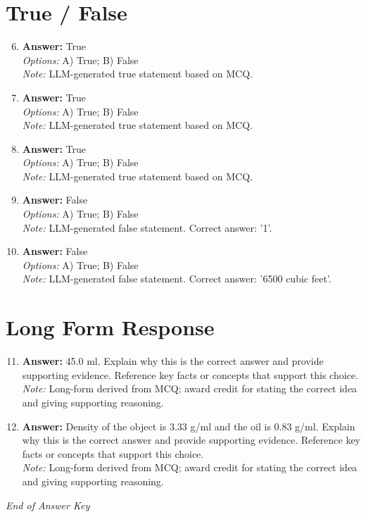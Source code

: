 \documentclass[12pt]{article}
\begin{document}
\section*{True / False}
\begin{enumerate}[label=\arabic*.]
\setcounter{enumi}{5}
\item \textbf{Answer:} True
\\ \textit{Options:} A) True; B) False
\\ \textit{Note:} LLM-generated true statement based on MCQ.
\item \textbf{Answer:} True
\\ \textit{Options:} A) True; B) False
\\ \textit{Note:} LLM-generated true statement based on MCQ.
\item \textbf{Answer:} True
\\ \textit{Options:} A) True; B) False
\\ \textit{Note:} LLM-generated true statement based on MCQ.
\item \textbf{Answer:} False
\\ \textit{Options:} A) True; B) False
\\ \textit{Note:} LLM-generated false statement. Correct answer: '1'.
\item \textbf{Answer:} False
\\ \textit{Options:} A) True; B) False
\\ \textit{Note:} LLM-generated false statement. Correct answer: '6500 cubic feet'.
\end{enumerate}

\section*{Long Form Response}
\begin{enumerate}[label=\arabic*.]
\setcounter{enumi}{10}
\item \textbf{Answer:} 45.0 ml. Explain why this is the correct answer and provide supporting evidence. Reference key facts or concepts that support this choice.
\\ \textit{Note:} Long-form derived from MCQ; award credit for stating the correct idea and giving supporting reasoning.
\item \textbf{Answer:} Density of the object is 3.33 g/ml and the oil is 0.83 g/ml. Explain why this is the correct answer and provide supporting evidence. Reference key facts or concepts that support this choice.
\\ \textit{Note:} Long-form derived from MCQ; award credit for stating the correct idea and giving supporting reasoning.
\end{enumerate}

\vfill
\noindent\textit{End of Answer Key}
\end{document}
